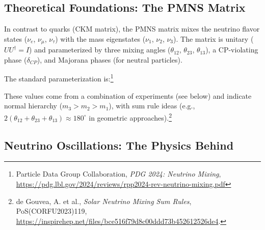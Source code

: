	\subsection{Theoretical Foundations: The PMNS Matrix}
	
	In contrast to quarks (CKM matrix), the PMNS matrix mixes the neutrino flavor states ($\nu_e$, $\nu_\mu$, $\nu_\tau$) with the mass eigenstates ($\nu_1$, $\nu_2$, $\nu_3$). The matrix is unitary ($U U^\dagger = I$) and parameterized by three mixing angles ($\theta_{12}$, $\theta_{23}$, $\theta_{13}$), a CP-violating phase ($\delta_{CP}$), and Majorana phases (for neutral particles).
	
	The standard parameterization is:\footnote{Particle Data Group Collaboration, \emph{PDG 2024: Neutrino Mixing}, \url{https://pdg.lbl.gov/2024/reviews/rpp2024-rev-neutrino-mixing.pdf}}
	
	\begin{table}[h]
		\centering
		\caption{PDG 2024 Mixing Parameters}
		\label{tab:pdgparams}
	\end{table}
	
	These values come from a combination of experiments (see below) and indicate normal hierarchy ($m_3 > m_2 > m_1$), with sum rule ideas (e.g., $2(\theta_{12} + \theta_{23} + \theta_{13}) \approx 180^\circ$ in geometric approaches).\footnote{de Gouvea, A. et al., \emph{Solar Neutrino Mixing Sum Rules}, PoS(CORFU2023)119, \url{https://inspirehep.net/files/bce516f79d8c00ddd73b452612526de4}.}
	
	\subsection{Neutrino Oscillations: The Physics Behind}
	
